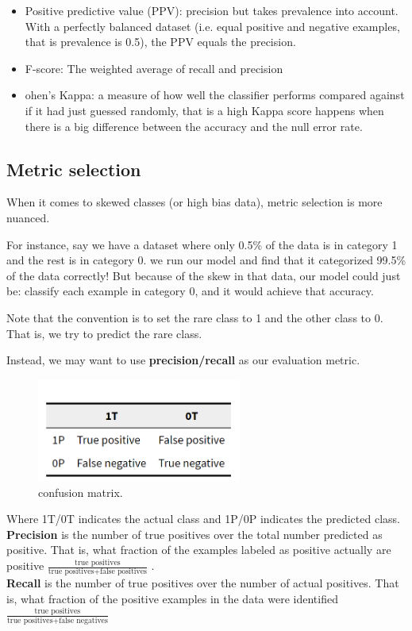 \begin{itemize}
\item Positive predictive value (PPV): precision but takes prevalence into account. With a perfectly balanced dataset (i.e. equal positive and negative examples, that is prevalence is 0.5), the PPV equals the precision.

\item F-score: The weighted average of recall and precision

\item ohen's Kappa: a measure of how well the classifier performs compared against if it had just guessed randomly, that is a high Kappa score happens when there is a big difference between the accuracy and the null error rate.

\end{itemize}

\subsection{Metric selection}
When it comes to skewed classes (or high bias data), metric selection is more nuanced.

For instance, say we have a dataset where only 0.5\% of the data is in category 1 and the rest is in category 0. we run our model and find that it categorized 99.5\% of the data correctly! But because of the skew in that data, our model could just be: classify each example in category 0, and it would achieve that accuracy.

Note that the convention is to set the rare class to 1 and the other class to 0. That is, we try to predict the rare class.

Instead, we may want to use \textbf{precision/recall} as our evaluation metric.

\begin{figure}[H]
\centering
\includegraphics[width=0.6\textwidth]{img/TP.PNG}
\caption{  confusion matrix.}
\label{fig:TP}
\end{figure}

Where 1T/0T indicates the actual class and 1P/0P indicates the predicted class.\\
\textbf{Precision} is the number of true positives over the total number predicted as positive. That is, what fraction of the examples labeled as positive actually are positive  $\frac{\text{true positives}}{\text{true positives} + \text{false positives}}$ .\\
\textbf{Recall} is the number of true positives over the number of actual positives. That is, what fraction of the positive examples in the data were identified  $\frac{\text{true positives}}{\text{true positives} + \text{false negatives}}$
\newline
\newline
\newline
